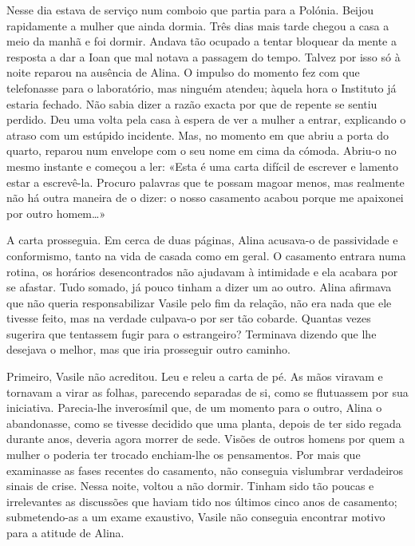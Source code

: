 Nesse dia estava de serviço num comboio que partia para a Polónia.
Beijou rapidamente a mulher que ainda dormia. Três dias mais tarde
chegou a casa a meio da manhã e foi dormir. Andava tão ocupado a tentar
bloquear da mente a resposta a dar a Ioan que mal notava a passagem do
tempo. Talvez por isso só à noite reparou na ausência de Alina. O
impulso do momento fez com que telefonasse para o laboratório, mas
ninguém atendeu; àquela hora o Instituto já estaria fechado. Não sabia
dizer a razão exacta por que de repente se sentiu perdido. Deu uma volta
pela casa à espera de ver a mulher a entrar, explicando o atraso com um
estúpido incidente. Mas, no momento em que abriu a porta do quarto,
reparou num
envelope com o seu nome em cima da cómoda. Abriu-o no mesmo instante e
começou a ler: «Esta é uma carta difícil de escrever e lamento estar a
escrevê-la. Procuro palavras que te possam magoar menos, mas realmente
não há outra maneira de o dizer: o nosso casamento acabou porque me
apaixonei por outro homem\ldots{}»

A carta prosseguia. Em cerca de duas páginas, Alina acusava-o de
passividade e conformismo, tanto na vida de casada como em geral. O
casamento entrara numa rotina, os horários desencontrados não ajudavam à
intimidade e ela acabara por se afastar. Tudo somado, já pouco tinham a
dizer um ao outro. Alina afirmava que não queria responsabilizar
Vasile pelo fim da relação, não era nada que ele tivesse feito, mas na
verdade culpava-o por ser tão cobarde. Quantas vezes sugerira que
tentassem fugir para o estrangeiro? Terminava dizendo que lhe desejava o
melhor, mas que iria prosseguir outro caminho.

Primeiro, Vasile não acreditou. Leu e releu a carta de pé. As mãos
viravam e tornavam a virar as folhas, parecendo separadas de si, como se
flutuassem por sua iniciativa. Parecia-lhe inverosímil que, de um
momento para o outro, Alina o abandonasse, como se tivesse decidido que
uma planta, depois de ter sido regada durante anos, deveria agora morrer
de sede. Visões de outros homens por quem a mulher o poderia ter trocado
enchiam-lhe os pensamentos. Por mais que examinasse as fases recentes
do casamento, não conseguia vislumbrar verdadeiros sinais de crise.
Nessa noite, voltou a não dormir. Tinham sido tão poucas e irrelevantes
as discussões que haviam tido nos últimos cinco anos de casamento;
submetendo-as a um
exame exaustivo, Vasile não conseguia encontrar motivo para a atitude de
Alina.

